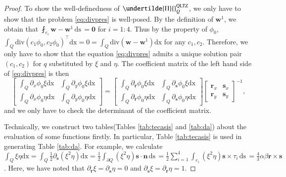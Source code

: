 \documentclass[12pt,showkeys]{amsart}
\begin{document}
\begin{proof}
To show the well-definedness of $\undertilde{\Pi}{}_Q^{\rm QLTZ}$, we only have to show that the problem \eqref{eq:divpres} is well-posed. By the definition of $\mathbf{w}^1$, we obtain that $\fint_{e_i}\mathbf{w}-\mathbf{w}^1{\,\mathrm{ds}\,}=\mathbf{0}$ for $i=1:4$. Thus by the property of $\phi_0$, $\int_Q\mathrm{div}(c_1\phi_0,c_2\phi_0)^\top{\mathrm{dx}}=0=\int_Q\mathrm{div}(\mathbf{w}-\mathbf{w}^1){\mathrm{dx}}$ for any $c_1,c_2$. Therefore, we only have to show that the equation \eqref{eq:divpres} admits a unique solution pair $(c_1,c_2)$ for $q$ substituted by $\xi$ and $\eta$. The coefficient matrix of the left hand side of \eqref{eq:divpres} is then
$$
\displaystyle
\left[
\begin{array}{cc}
\displaystyle\int_Q\partial_x\phi_0\xi{\mathrm{dx}} & \displaystyle\int_Q\partial_y\phi_0 \xi{\mathrm{dx}}\\
\displaystyle\int_Q\partial_x\phi_0\eta{\mathrm{dx}} & \displaystyle\int_Q\partial_y\phi_0\eta{\mathrm{dx}}
\end{array}
\right] = 
\left[
\begin{array}{cc}
\displaystyle\int_Q\partial_{\mathbf{r}}\phi_0\xi{\mathrm{dx}} & \displaystyle\int_Q\partial_{\mathbf{s}}\phi_0 \xi{\mathrm{dx}}\\
\displaystyle\int_Q\partial_{\mathbf{r}}\phi_0\eta{\mathrm{dx}} & \displaystyle\int_Q\partial_{\mathbf{s}}\phi_0\eta{\mathrm{dx}}
\end{array}
\right]
\left[
\begin{array}{cc}
{\mathbf{r}}_x & {\mathbf{s}}_x \\
{\mathbf{r}}_y & {\mathbf{s}}_y
\end{array}
\right]^{-1},
$$
and we only have to check the determinant of the coefficient matrix.

Technically, we construct two tables(Tables \ref{tab:tecasis} and \ref{tab:da}) about the evaluation of some functions firstly. In particular, Table \ref{tab:tecasis} is used in generating Table \ref{tab:da}. For example, we calculate $\int_Q\xi\eta{\mathrm{dx}}=\int_Q\frac{1}{2}\partial_{\mathbf{s}}(\xi^2\eta){\mathrm{dx}}=\frac{1}{2}\int_{\partial Q}(\xi^2\eta){\mathbf{s}}\cdot\mathbf{n}{\,\mathrm{ds}\,}=\frac{1}{2}\sum_{i=1}^4\int_{e_i}(\xi^2\eta){\mathbf{s}}\times\tau_i{\,\mathrm{ds}\,}=\frac{4}{3}\alpha\beta{\mathbf{r}}\times{\mathbf{s}}$. Here, we have noted that $\partial_{\mathbf{r}}\xi=\partial_{\mathbf{s}}\eta=0$ and $\partial_{\mathbf{s}}\xi=\partial_{\mathbf{r}}\eta=1$.


\end{proof}
\end{document}
